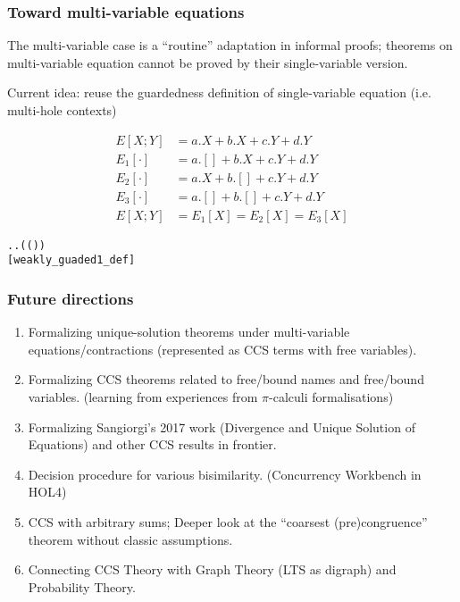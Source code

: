 \begin{frame}
\frametitle{Toward multi-variable equations}
\begin{small}
The multi-variable case is a ``routine'' adaptation in informal
proofs; theorems on multi-variable equation cannot be proved
by their single-variable version.

Current idea: reuse the guardedness definition of single-variable equation
(i.e. multi-hole contexts)
\begin{examples}
\vspace{-3ex}
\begin{align*}
E[X; Y] &= a.X + b.X + c.Y + d.Y \\
E_1[\cdot] &= a.[] + b.X + c.Y + d.Y \\
E_2[\cdot] &= a.X + b.[] + c.Y + d.Y \\
E_3[\cdot] &= a.[] + b.[] + c.Y + d.Y \\
E[X; Y] &= E_1[X] = E_2[X] = E_3[X]
\end{align*}
\end{examples}
\begin{definition}
\begin{alltt}
  \HOLSymConst{\HOLTokenEquiv{}}
\HOLSymConst{\HOLTokenForall{}}.  \HOLSymConst{\HOLTokenIn{}}   \HOLSymConst{\HOLTokenImp{}} \HOLSymConst{\HOLTokenForall{}}.   \HOLSymConst{\HOLTokenConj{}} ( ( ) \HOLSymConst{=} ) \HOLSymConst{\HOLTokenImp{}}  
\hfill{[weakly_guaded1_def]}
\end{alltt}
\end{definition}
\end{small}
\end{frame}

%
\begin{frame}
\frametitle{Future directions}
\begin{enumerate}
\item Formalizing unique-solution theorems under multi-variable
  equations/contractions (represented as CCS terms with free variables).
\item Formalizing CCS theorems related to free/bound names and
  free/bound variables. (learning from experiences from $\pi$-calculi formalisations)
\item Formalizing Sangiorgi's 2017 work (Divergence and Unique
  Solution of Equations) and other CCS results in frontier.
\item Decision procedure for various bisimilarity. (Concurrency
  Workbench in HOL4)
\item CCS with arbitrary sums; Deeper look at the ``coarsest (pre)congruence'' theorem without
 classic assumptions.
\item Connecting CCS Theory with Graph Theory (LTS as digraph) and
  Probability Theory.
\end{enumerate}
\end{frame}

